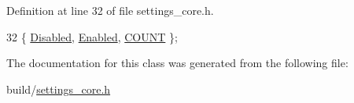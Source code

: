 Definition at line 32 of file settings\+\_\+core.\+h.


\begin{DoxyCode}
32 \{ \hyperlink{classOkular_1_1SettingsCore_1_1EnumGraphicsAntialias_a124c4398a0feb1b529fbae0accbc89cea7dd89822738b507cbbc1683ab9dfce48}{Disabled}, \hyperlink{classOkular_1_1SettingsCore_1_1EnumGraphicsAntialias_a124c4398a0feb1b529fbae0accbc89cead7142b8fc6f562d888be519480612e7c}{Enabled}, \hyperlink{classOkular_1_1SettingsCore_1_1EnumGraphicsAntialias_a124c4398a0feb1b529fbae0accbc89ceaf7b16ffad41eff848ce4c9af7be06dc2}{COUNT} \};
\end{DoxyCode}


The documentation for this class was generated from the following file\+:\begin{DoxyCompactItemize}
\item 
build/\hyperlink{settings__core_8h}{settings\+\_\+core.\+h}\end{DoxyCompactItemize}
